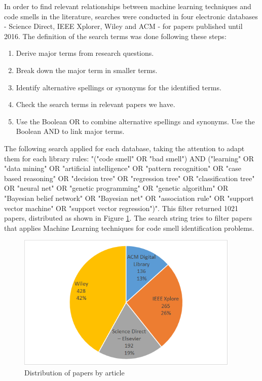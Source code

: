 In order to find relevant relationships between machine learning techniques and code smells in the literature, searches were conducted in four electronic databases - Science Direct, IEEE Xplorer, Wiley and ACM - for papers published until 2016. The definition of the search terms was done following these steps:
\begin{enumerate}
    \item{Derive major terms from research questions.}
    \item{Break down the major term in smaller terms.}
    \item{Identify alternative spellings or synonyms for the identified terms.}
    \item{Check the search terms in relevant papers we have.}
    \item{Use the Boolean OR to combine alternative spellings and synonyms. Use the Boolean AND to link major terms.}
\end{enumerate}

The following search applied for each database, taking the attention to adapt them for each library rules: "("code smell" OR "bad smell") AND ("learning" OR "data mining" OR "artificial intelligence" OR "pattern recognition" OR "case based reasoning" OR "decision tree" OR "regression tree" OR "classification tree" OR "neural net" OR "genetic programming" OR "genetic algorithm" OR "Bayesian belief network" OR "Bayesian net" OR "association rule" OR "support vector machine" OR "support vector regression")". This filter returned 1021 papers, distributed as shown in Figure \ref{fig:librariesImage}. The search string tries to filter papers that applies Machine Learning techniques for code smell identification problems.

\begin{figure}[hbt] 
	\caption{Distribution of papers by article}
	\label{fig:librariesImage}
	\includegraphics[width=0.95\textwidth]{imagens/librariesDistributionImage.png}
\end{figure}

